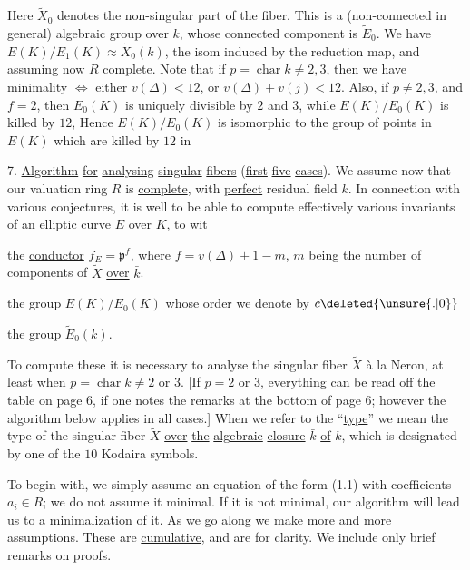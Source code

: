 Here $\widetilde X_0$ denotes the non-singular part of the fiber. This is a (non-connected in general) algebraic group over $k$, whose connected component is $\widetilde E_0$. We have $E(K)/E_1(K)\approx\widetilde X_0(k)$, the isom induced by the reduction map, and assuming now $R$ complete. Note that if $p=\operatorname{char} k\ne2,3$, then we have minimality $\Longleftrightarrow$ \uline{either} $v(\Delta)<12$, \uline{or} $v(\Delta)+v(j)<12$. Also, if $p\ne2,3$, and $f=2$, then $E_0(K)$ is uniquely divisible by $2$ and $3$, while $E(K)/E_0(K)$ is killed by $12$, Hence $E(K)/E_0(K)$ is isomorphic to the group of points in $E(K)$ which are killed by $12$ in %
\clearpage

7. \uline{Algorithm} \uline{for} \uline{analysing} \uline{singular} \uline{fibers} (\uline{first} \uline{five} \uline{cases}). We assume now that our valuation ring $R$ is \uline{complete}, with \uline{perfect} residual field $k$. In connection with various conjectures, it is well to be able to compute effectively various invariants of an elliptic curve $E$ over $K$, to wit

the \uline{conductor} $f_E={\mathfrak{p}}^{f}$, where $f=v(\Delta)+1-m$, $m$ being the number of components of $\widetilde X$ \uline{over} $\bar k$.

the group $E(K)/E_0(K)$ whose order we denote by $c\deleted{\unsure{.|0}}$

the group $\widetilde E_0(k)$.

To compute these it is necessary to analyse the singular fiber $\widetilde X$ à la Neron, at least when $p=\operatorname{char} k\ne2\text{ or }3$. \reversemarginpar{}[If $p=2$ or $3$, everything can be read off the table on page $6$,  if one notes the remarks at the bottom of page $6$; however the algorithm below applies in all cases.] When we refer to the ``\uline{type}'' we mean the type of the singular fiber $\widetilde X$ \uline{over} \uline{the} \uline{algebraic} \uline{closure} $\bar k$ \uline{of} $k$, which is designated by one of the $10$ Kodaira symbols.

To begin with, we simply assume an equation of the form (1.1) with coefficients $\boxed{a_i\in R}$; we do not assume it minimal. If it is not minimal, our algorithm will lead us to a minimalization of it. As we go along we make more and more assumptions. These are \uline{cumulative}, and are  for clarity. We include only brief remarks on proofs.


